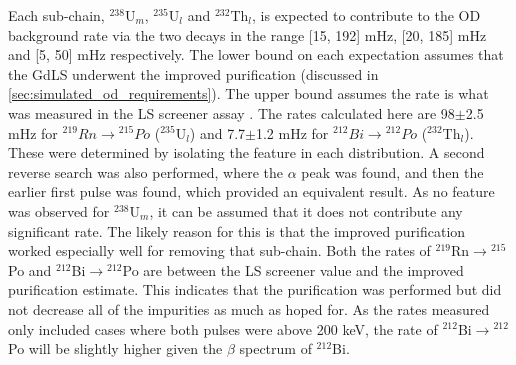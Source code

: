 \par
Each sub-chain, ${}^{238}$U$_{m}$, ${}^{235}$U$_{l}$ and ${}^{232}$Th$_{l}$, is expected to contribute to the OD background rate via the two decays in the range [15, 192] mHz, [20, 185] mHz and [5, 50] mHz respectively.
The lower bound on each expectation assumes that the GdLS underwent the improved purification (discussed in \autoref{sec:simulated_od_requirements}).
The upper bound assumes the rate is what was measured in the LS screener assay \cite{scotthaselschwardt_thesis_ref}.
The rates calculated here are 98$\pm$2.5 mHz for ${}^{219}Rn \to {}^{215}Po$ (${}^{235}$U$_{l}$) and 7.7$\pm$1.2 mHz for ${}^{212}Bi \to {}^{212}Po$ (${}^{232}$Th$_{l}$).
These were determined by isolating the feature in each distribution.
A second reverse search was also performed, where the $\alpha$ peak was found, and then the earlier first pulse was found, which provided an equivalent result.
As no feature was observed for ${}^{238}$U$_{m}$, it can be assumed that it does not contribute any significant rate.
The likely reason for this is that the improved purification worked especially well for removing that sub-chain.
Both the rates of ${}^{219}$Rn$\to {}^{215}$Po and ${}^{212}$Bi$\to {}^{212}$Po are between the LS screener value and the improved purification estimate.
This indicates that the purification was performed but did not decrease all of the impurities as much as hoped for.
As the rates measured only included cases where both pulses were above 200 keV, the rate of ${}^{212}$Bi$\to {}^{212}$Po will be slightly higher given the $\beta$ spectrum of ${}^{212}$Bi. 

